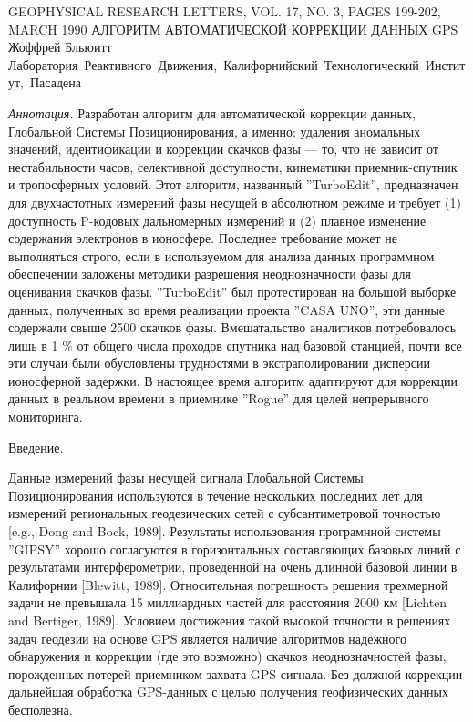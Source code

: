 \documentclass[12pt,a4paper]{article}
\begin{document}
\sloppy

\begin{center}
GEOPHYSICAL RESEARCH LETTERS, VOL. 17, NO. 3, PAGES 199-202, MARCH 1990
\bigbreak
АЛГОРИТМ АВТОМАТИЧЕСКОЙ КОРРЕКЦИИ ДАННЫХ GPS
\medbreak
Жоффрей Бльюитт
\medbreak
\mbox{Лаборатория Реактивного Движения, Калифорнийский Технологический Институт, Пасадена}
\end{center}

\emph{Аннотация.} Разработан алгоритм для автоматической коррекции данных,
Глобальной Системы Позиционирования, а именно: удаления аномальных значений, 
идентификации и коррекции скачков фазы --- то, что не зависит от нестабильности
часов, селективной доступности, кинематики приемник-спутник и тропосферных
условий. Этот алгоритм, названный ''TurboEdit'', предназначен для двухчастотных
измерений фазы несущей в абсолютном режиме и требует (1) доступность P-кодовых 
дальномерных измерений и (2) плавное изменение содержания электронов в 
ионосфере. Последнее требование может не выполняться строго, если в 
используемом для анализа данных программном обеспечении заложены методики 
разрешения неоднозначности фазы для оценивания скачков фазы. ''TurboEdit''
был протестирован на большой выборке данных, полученных во время реализации
проекта ''CASA UNO'', эти данные содержали свыше 2500 скачков фазы.
Вмешатальство аналитиков потребовалось лишь в 1 \% от общего числа проходов
спутника над базовой станцией, почти все эти случаи были обусловлены
трудностями в экстраполировании дисперсии ионосферной задержки. В настоящее
время алгоритм адаптируют для коррекции данных в реальном времени в приемнике
''Rogue'' для целей непрерывного мониторинга.

\medbreak
\begin{center}
	Введение. 
\end{center}

\medbreak
Данные измерений фазы несущей сигнала Глобальной Системы Позиционирования
используются в течение нескольких последних лет для измерений региональных
геодезических сетей с субсантиметровой точностью [e.g., Dong and Bock, 1989]. 
Результаты использования програмнной системы ''GIPSY'' хорошо согласуются в 
горизонтальных составляющих базовых линий с результатами интерферометрии, 
проведенной на очень длинной базовой линии в Калифорнии [Blewitt, 1989].
Относительная погрешность решения трехмерной задачи не превышала 15 миллиардных
частей для расстояния 2000 км [Lichten and Bertiger, 1989]. Условием достижения
такой высокой точности в решениях задач геодезии на основе GPS является наличие
алгоритмов надежного обнаружения и коррекции (где это возможно) скачков 
неоднозначностей фазы,
порожденных потерей приемником захвата GPS-сигнала. Без должной коррекции
дальнейшая обработка GPS-данных с целью получения геофизических данных
бесполезна.
\end{document}
